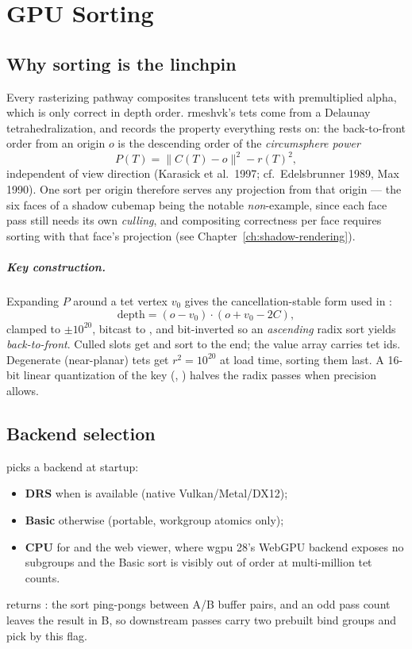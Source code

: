 \chapter{GPU Sorting}\label{ch:gpu-sorting}

\section{Why sorting is the linchpin}

Every rasterizing pathway composites translucent tets with premultiplied
alpha, which is only correct in depth order. rmeshvk's tets come from a
Delaunay tetrahedralization, and  records the
property everything rests on: the back-to-front order from an origin $o$ is
the descending order of the \emph{circumsphere power}
\[
  P(T) = \lVert C(T) - o \rVert^2 - r(T)^2 ,
\]
independent of view direction (Karasick et al.\ 1997; cf.\ Edelsbrunner
1989, Max 1990). One sort per origin therefore serves any projection from
that origin --- the six faces of a shadow cubemap being the notable
\emph{non}-example, since each face pass still needs its own
\emph{culling}, and compositing correctness per face requires sorting with
that face's projection (see Chapter~\ref{ch:shadow-rendering}).

\paragraph{Key construction.} Expanding $P$ around a tet vertex $v_0$ gives
the cancellation-stable form used in :
\[
  \text{depth} = (o - v_0) \cdot (o + v_0 - 2C) ,
\]
clamped to $\pm 10^{20}$, bitcast to , and bit-inverted so an
\emph{ascending} radix sort yields \emph{back-to-front}. Culled slots get
 and sort to the end; the value array carries tet ids.
Degenerate (near-planar) tets get $r^2 = 10^{20}$ at load time, sorting them
last. A 16-bit linear quantization of the key
(, ) halves the radix
passes when precision allows.

\section{Backend selection}

 picks a backend at startup:
\begin{itemize}
\item \textbf{DRS} when  is available (native
  Vulkan/Metal/DX12);
\item \textbf{Basic} otherwise (portable, workgroup atomics only);
\item \textbf{CPU} for  and the web viewer, where wgpu
  28's WebGPU backend exposes no subgroups and the Basic sort is visibly
  out of order at multi-million tet counts.
\end{itemize}
 returns : the sort ping-pongs
between A/B buffer pairs, and an odd pass count leaves the result in B, so
downstream passes carry two prebuilt bind groups and pick by this flag.

